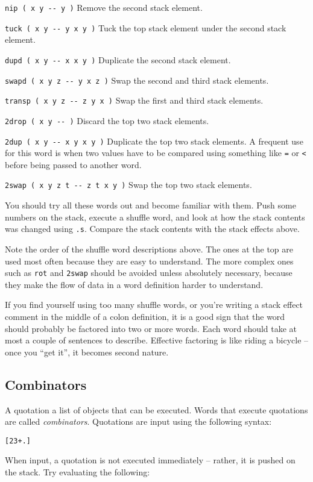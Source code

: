 \documentclass[english]{article}
\begin{document}
\texttt{nip ( x y -{}- y )} Remove the second stack element.

\texttt{tuck ( x y -{}- y x y )} Tuck the top stack element under
the second stack element.

\texttt{dupd ( x y -{}- x x y )} Duplicate the second stack element.

\texttt{swapd ( x y z -{}- y x z )} Swap the second and third stack elements.

\texttt{transp ( x y z -{}- z y x )} Swap the first and third stack elements.

\texttt{2drop ( x y -{}- )} Discard the top two stack elements.

\texttt{2dup ( x y -{}- x y x y )} Duplicate the top two stack elements. A frequent use for this word is when two values have to be compared using something like \texttt{=} or \texttt{<} before being passed to another word.

\texttt{2swap ( x y z t -{}- z t x y )} Swap the top two stack elements.

You should try all these words out and become familiar with them. Push some numbers on the stack,
execute a shuffle word, and look at how the stack contents was changed using
\texttt{.s}. Compare the stack contents with the stack effects above.

Note the order of the shuffle word descriptions above. The ones at
the top are used most often because they are easy to understand. The
more complex ones such as \texttt{rot} and \texttt{2swap} should be avoided unless absolutely necessary, because
they make the flow of data in a word definition harder to understand.

If you find yourself using too many shuffle words, or you're writing
a stack effect comment in the middle of a colon definition, it is
a good sign that the word should probably be factored into two or
more words. Each word should take at most a couple of sentences to describe. Effective factoring is like riding a bicycle -- once you ``get it'', it becomes second nature.


\subsection{Combinators}

A quotation a list of objects that can be executed. Words that execute quotations are called \emph{combinators}. Quotations are input
using the following syntax:

\begin{alltt}
{[} 2 3 + . {]}
\end{alltt}
When input, a quotation is not executed immediately -- rather, it
is pushed on the stack. Try evaluating the following:
\end{document}
